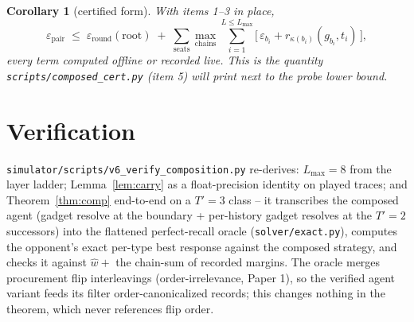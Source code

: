 \documentclass[11pt]{article}
\theoremstyle{plain}
\newtheorem{corollary}[theorem]{Corollary}
\theoremstyle{definition}
\theoremstyle{remark}
\newcommand{\pathmax}[1]{\max_{#1}}
\begin{document}
\begin{corollary}[certified form]\label{cor:cert}
With items 1--3 in place,
\[
\varepsilon_{\mathrm{pair}} \;\le\;
\varepsilon_{\mathrm{round}}(\mathrm{root}) \;+\;
\sum_{\text{seats}} \pathmax{\text{chains}}
\sum_{i=1}^{L \le L_{\max}} \bigl[\, \varepsilon_{b_i} +
r_{\kappa(b_i)}(g_{b_i}, t_i) \,\bigr],
\]
every term computed offline or recorded live. This is the quantity
\texttt{scripts/composed\_cert.py} (item 5) will print next to the
probe lower bound.
\end{corollary}

\section{Verification}

\texttt{simulator/scripts/v6\_verify\_composition.py} re-derives:
$L_{\max} = 8$ from the layer ladder; Lemma~\ref{lem:carry} as a
float-precision identity on played traces; and Theorem~\ref{thm:comp}
end-to-end on a $T'{=}3$ class -- it transcribes the composed agent
(gadget resolve at the boundary + per-history gadget resolves at the
$T'{=}2$ successors) into the flattened perfect-recall oracle
(\texttt{solver/exact.py}), computes the opponent's exact per-type
best response against the composed strategy, and checks it against
$\hat w + $ the chain-sum of recorded margins. The oracle merges
procurement flip interleavings (order-irrelevance, Paper 1), so the
verified agent variant feeds its filter order-canonicalized records;
this changes nothing in the theorem, which never references flip
order.
\end{document}
